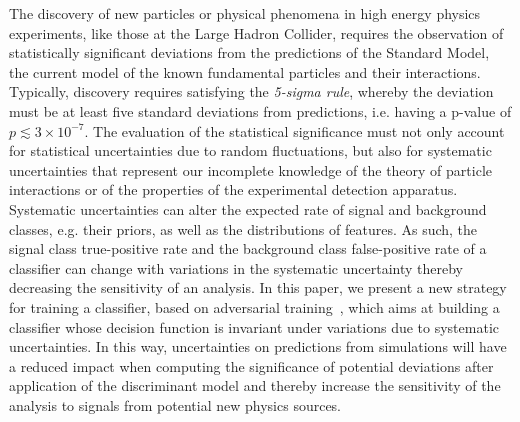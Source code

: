 \documentclass[twocolumn,superscriptaddress,aps]{revtex4-1}
\theoremstyle{plain}
\begin{document}
The discovery of new particles or physical phenomena in high energy physics
experiments, like those at the Large Hadron Collider, requires the observation
of statistically significant deviations from the predictions of the Standard
Model, the current model of the known fundamental particles and their
interactions.  Typically, discovery requires satisfying the \textit{5-sigma
rule}, whereby the deviation must be at least five standard deviations from
predictions, i.e. having a p-value of $p \lesssim 3 \times 10^{-7}$. The
evaluation of the statistical significance must not only account for statistical
uncertainties due to random fluctuations, but also for
systematic uncertainties that represent our incomplete knowledge of the theory
of particle interactions or of the properties of the experimental detection
apparatus. Systematic uncertainties can alter the expected rate of signal and
background classes, e.g. their priors, as well as the distributions of features.
As such, the signal class true-positive rate and the background class
false-positive rate of a classifier can change with variations in the systematic
uncertainty thereby decreasing the sensitivity of an analysis. In this paper, we
present a new strategy for training a classifier, based on adversarial
training~\citep{goodfellow2014generative}, which aims at building a classifier
whose decision function is invariant under variations due to systematic
uncertainties.  In this way, uncertainties on predictions from simulations will
have a reduced impact when computing the significance of potential deviations
after application of the discriminant model and thereby increase the sensitivity
of the analysis to signals from potential new physics sources.
\end{document}

